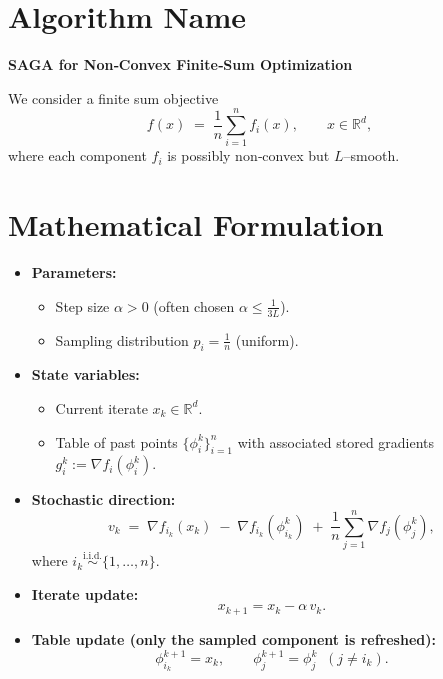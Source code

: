 \documentclass{article}
\newcommand{\RR}{\mathbb{R}}
\begin{document}
\section*{Algorithm Name}
\textbf{SAGA for Non‑Convex Finite‑Sum Optimization}  

We consider a finite sum objective
\[
f(x)\;=\;\frac{1}{n}\sum_{i=1}^{n} f_i(x),\qquad x\in\RR^{d},
\]
where each component $f_i$ is possibly non‑convex but $L$–smooth.

\section*{Mathematical Formulation}
\begin{itemize}
    \item \textbf{Parameters:}
    \begin{itemize}
        \item Step size $\alpha>0$ (often chosen $\alpha\le \tfrac{1}{3L}$).
        \item Sampling distribution $p_i=\frac1n$ (uniform).
    \end{itemize}
    \item \textbf{State variables:}
    \begin{itemize}
        \item Current iterate $x_k\in\RR^{d}$.
        \item Table of past points $\{\phi_i^k\}_{i=1}^{n}$ with associated stored gradients $g_i^k:=\nabla f_i(\phi_i^k)$.
    \end{itemize}
    \item \textbf{Stochastic direction:} 
    \[
    v_k \;=\; \nabla f_{i_k}(x_k)\;-\;\nabla f_{i_k}(\phi_{i_k}^k)\;+\;\frac1n\sum_{j=1}^{n}\nabla f_j(\phi_j^k),
    \tag{1}
    \]
    where $i_k\stackrel{\text{i.i.d.}}{\sim} \{1,\dots,n\}$.
    \item \textbf{Iterate update:}
    \[
    x_{k+1}=x_k-\alpha\,v_k. \tag{2}
    \]
    \item \textbf{Table update (only the sampled component is refreshed):}
    \[
    \phi_{i_k}^{k+1}=x_k,\qquad 
    \phi_{j}^{k+1}= \phi_{j}^{k}\;\;(j\neq i_k). \tag{3}
    \]
\end{itemize}

\end{document}
